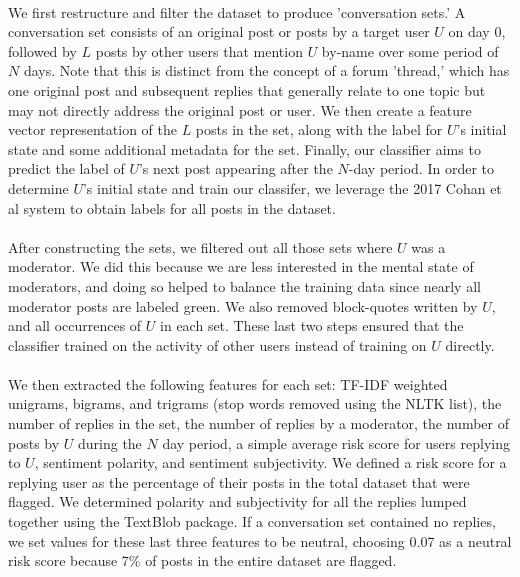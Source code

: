 \documentclass{article}
\begin{document}
\paragraph{}We first restructure and filter the dataset to produce 'conversation sets.' A conversation set consists of an original post or posts by a target user $U$ on day 0, followed by $L$ posts by other users that mention $U$ by-name over some period of $N$ days. Note that this is distinct from the concept of a forum 'thread,' which has one original post and subsequent replies that generally relate to one topic but may not directly address the original post or user. We then create a feature vector representation of the $L$ posts in the set, along with the label for $U$'s initial state and some additional metadata for the set. Finally, our classifier aims to predict the label of $U$'s next post appearing after the $N$-day period. In order to determine $U$'s initial state and train our classifer, we leverage the 2017 Cohan et al system to obtain labels for all posts in the dataset.

\paragraph{}After constructing the sets, we filtered out all those sets where $U$ was a moderator. We did this because we are less interested in the mental state of moderators, and doing so helped to balance the training data since nearly all moderator posts are labeled green. We also removed block-quotes written by $U$, and all occurrences of $U$ in each set. These last two steps ensured that the classifier trained on the activity of other users instead of training on $U$ directly.

\paragraph{}We then extracted the following features for each set: TF-IDF weighted unigrams, bigrams, and trigrams (stop words removed using the NLTK list), the number of replies in the set, the number of replies by a moderator, the number of posts by $U$ during the $N$ day period, a simple average risk score for users replying to $U$, sentiment polarity, and sentiment subjectivity. We defined a risk score for a replying user as the percentage of their posts in the total dataset that were flagged. We determined polarity and subjectivity for all the replies lumped together using the TextBlob package. If a conversation set contained no replies, we set values for these last three features to be neutral, choosing 0.07 as a neutral risk score because 7\% of posts in the entire dataset are flagged.
\end{document}
